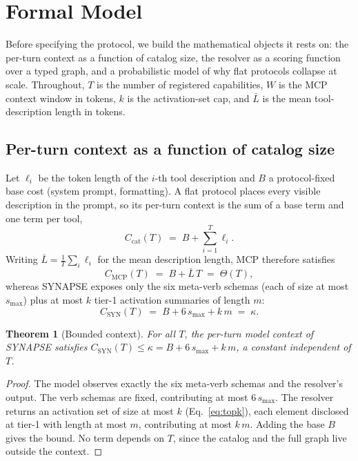 \documentclass[11pt]{article}
\theoremstyle{plain}
\newtheorem{theorem}{Theorem}
\theoremstyle{definition}
\begin{document}
\section{Formal Model}
\label{sec:model}
Before specifying the protocol, we build the mathematical objects it rests on:
the per-turn context as a function of catalog size, the resolver as a scoring
function over a typed graph, and a probabilistic model of why flat protocols
collapse at scale. Throughout, $T$ is the number of registered capabilities,
$W$ is the MCP context window in tokens, $k$ is the activation-set cap, and
$\bar L$ is the mean tool-description length in tokens.

\subsection{Per-turn context as a function of catalog size}
Let $\ell_i$ be the token length of the $i$-th tool description and $B$ a
protocol-fixed base cost (system prompt, formatting). A flat protocol places
every visible description in the prompt, so its per-turn context is the sum of a
base term and one term per tool,
\begin{equation}
\label{eq:cat}
C_{\mathrm{cat}}(T) \;=\; B + \sum_{i=1}^{T} \ell_i .
\end{equation}
Writing $\bar L = \tfrac{1}{T}\sum_i \ell_i$ for the mean description length, MCP
therefore satisfies
\begin{equation}
\label{eq:cmcp}
C_{\mathrm{MCP}}(T) \;=\; B + \bar L\, T \;=\; \Theta(T),
\end{equation}
whereas SYNAPSE exposes only the six meta-verb schemas (each of size at most
$s_{\max}$) plus at most $k$ tier-1 activation summaries of length $m$:
\begin{equation}
\label{eq:csyn}
C_{\mathrm{SYN}}(T) \;=\; B + 6\,s_{\max} + k\,m \;=\; \kappa .
\end{equation}

\begin{theorem}[Bounded context]
\label{thm:ctx}
For all $T$, the per-turn model context of SYNAPSE satisfies
$C_{\mathrm{SYN}}(T) \le \kappa = B + 6\,s_{\max} + k\,m$, a constant independent
of $T$.
\end{theorem}
\begin{proof}
The model observes exactly the six meta-verb schemas and the resolver's output.
The verb schemas are fixed, contributing at most $6\,s_{\max}$. The resolver
returns an activation set of size at most $k$ (Eq.~\eqref{eq:topk}), each element
disclosed at tier-1 with length at most $m$, contributing at most $k\,m$. Adding
the base $B$ gives the bound. No term depends on $T$, since the catalog and the
full graph live outside the context.
\end{proof}
\end{document}

